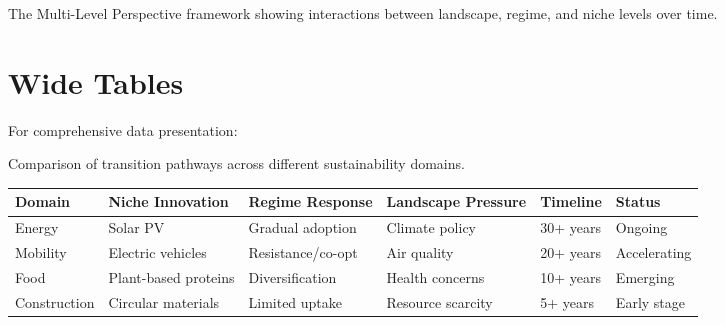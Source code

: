 \documentclass[
    fontsize=11pt,
    a4paper,
    twoside=true,
    open=any,
]{kaobook}
\begin{document}
\begin{widefigure}
    \centering
    \caption{The Multi-Level Perspective framework showing interactions between landscape, regime, and niche levels over time.}
\end{widefigure}

\section{Wide Tables}

For comprehensive data presentation:

\begin{widetable}
    \centering
    \caption{Comparison of transition pathways across different sustainability domains.}
    \begin{tabular}{llllll}
        \toprule
        \textbf{Domain} & \textbf{Niche Innovation} & \textbf{Regime Response} & \textbf{Landscape Pressure} & \textbf{Timeline} & \textbf{Status} \\
        \midrule
        Energy & Solar PV & Gradual adoption & Climate policy & 30+ years & Ongoing \\
        Mobility & Electric vehicles & Resistance/co-opt & Air quality & 20+ years & Accelerating \\
        Food & Plant-based proteins & Diversification & Health concerns & 10+ years & Emerging \\
        Construction & Circular materials & Limited uptake & Resource scarcity & 5+ years & Early stage \\
        \bottomrule
    \end{tabular}
\end{widetable}
\end{document}
